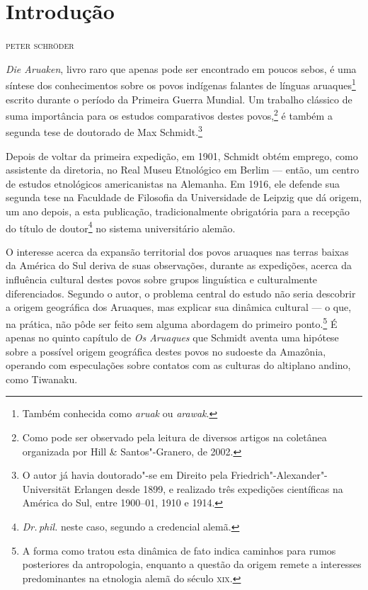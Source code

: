 \pagestyle{plain}

\newcommand{\subtitulo}[1]{\NoCaseChange{\textnormal{\break\Large\itshape#1}}}
\chapter*{Introdução\smallskip\subtitulo{Um clássico da etnologia\\ sul-americanista}}


\begin{flushright}
\textsc{peter schröder}\medskip
\end{flushright}

\noindent{}\textit{Die Aruaken}, livro raro que apenas pode ser encontrado em poucos sebos, é uma síntese dos conhecimentos sobre os povos indígenas falantes de línguas aruaques\footnote{Também conhecida como \textit{aruak} ou \textit{arawak}.} escrito durante o período da Primeira Guerra Mundial. Um trabalho clássico de suma importância para os estudos comparativos destes povos,\footnote{Como pode ser observado pela leitura de diversos artigos na coletânea organizada por Hill \& Santos"-Granero, de 2002.} é também a segunda tese de doutorado de Max Schmidt.\footnote{O autor já havia doutorado"-se em Direito pela Friedrich"-Alexander"-Universität Erlangen desde 1899, e realizado três expedições científicas na América do Sul, entre 1900--01, 1910 e 1914.}

Depois de voltar da primeira expedição, em 1901, Schmidt obtém emprego, como assistente da diretoria, no Real Museu Etnológico em Berlim --- então, um centro de estudos etnológicos americanistas na Alemanha. Em 1916, ele defende sua segunda tese na Faculdade de Filosofia da Universidade de Leipzig que dá origem, um ano depois, a esta publicação, tradicionalmente obrigatória para a recepção do título de doutor\footnote{\textit{Dr.\,phil.} neste caso, segundo a credencial alemã.} no sistema universitário alemão.

O interesse acerca da expansão territorial dos povos aruaques nas terras baixas da América do Sul deriva de suas observações, durante as expedições, acerca da influência cultural destes povos sobre grupos linguística e culturalmente diferenciados. Segundo o autor, o problema central do estudo não seria descobrir a origem geográfica dos Aruaques, mas explicar sua dinâmica cultural --- o que, na prática, não pôde ser feito sem alguma abordagem do primeiro ponto.\footnote{A forma como tratou esta dinâmica de fato indica caminhos para rumos posteriores da antropologia, enquanto a questão da origem remete a interesses predominantes na etnologia alemã do século \textsc{xix}.} É apenas no quinto capítulo de \textit{Os Aruaques} que Schmidt aventa uma hipótese sobre a possível origem geográfica destes povos no sudoeste da Amazônia, operando com especulações sobre contatos com as culturas do altiplano andino, como Tiwanaku.

